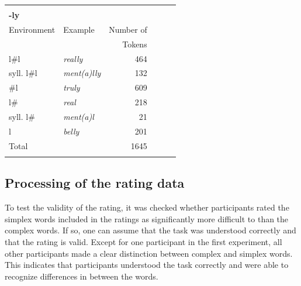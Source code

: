 \begin{table}
{\begin{tabular} {llrllr}
			& & & \\
			\textbf{-ly}&&& & & \\
			\midrule	%
			Environment & Example & Number of & & & \\
						 &  & Tokens & & & \\
			\midrule
			l\#l &\color{lsMidBlue}\textit{really} & 464 & & & \\ 
			syll. l\#l &\color{lsMidBlue}\textit{ment(a)lly} & 132 & & & \\ 
			\#l &\color{lsMidBlue}\textit{truly} & 609& & & \\ 
			l\# &\color{lsMidBlue}\textit{real} & 218& & & \\ 
			syll. l\#&\color{lsMidBlue}\textit{ment(a)l} &21& & &\\ 
			l &\color{lsMidBlue}\textit{belly} & 201& & & \\ 
			\midrule   	
			Total&  &1645 & & & \\ 

			\lspbottomrule
		\end{tabular}
	}
	
\end{table}



\subsection{Processing of the rating data} \label{Processing of the Rating Data}


To test the validity of the rating, it was checked whether participants rated the simplex words included in the ratings as significantly more difficult to  than the complex words. If so, one can assume that the task was understood correctly and that the rating is valid. 
Except for one participant in the first experiment, all other participants made a clear distinction between complex and simplex words. This indicates that participants understood the task correctly and were able to recognize differences in  between the words.

